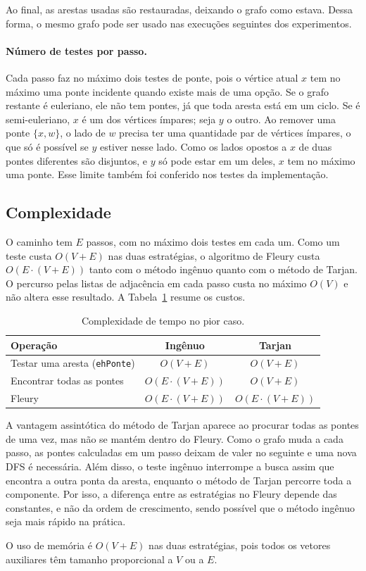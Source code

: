 Ao final, as arestas usadas são restauradas, deixando o grafo como estava. Dessa forma, o mesmo grafo pode ser usado nas execuções seguintes dos experimentos.

\paragraph{Número de testes por passo.} Cada passo faz no máximo dois testes de ponte, pois o vértice atual $x$ tem no máximo uma ponte incidente quando existe mais de uma opção. Se o grafo restante é euleriano, ele não tem pontes, já que toda aresta está em um ciclo. Se é semi-euleriano, $x$ é um dos vértices ímpares; seja $y$ o outro. Ao remover uma ponte $\{x, w\}$, o lado de $w$ precisa ter uma quantidade par de vértices ímpares, o que só é possível se $y$ estiver nesse lado. Como os lados opostos a $x$ de duas pontes diferentes são disjuntos, e $y$ só pode estar em um deles, $x$ tem no máximo uma ponte. Esse limite também foi conferido nos testes da implementação.

\subsection{Complexidade}

O caminho tem $E$ passos, com no máximo dois testes em cada um. Como um teste custa $O(V + E)$ nas duas estratégias, o algoritmo de Fleury custa $O(E \cdot (V + E))$ tanto com o método ingênuo quanto com o método de Tarjan. O percurso pelas listas de adjacência em cada passo custa no máximo $O(V)$ e não altera esse resultado. A Tabela~\ref{tab:complexidade} resume os custos.

\begin{table}[ht]
  \centering
  \caption{Complexidade de tempo no pior caso.}
  \label{tab:complexidade}
  \begin{tabular}{lcc}
    \hline
    Operação & Ingênuo & Tarjan \\
    \hline
    Testar uma aresta (\texttt{ehPonte}) & $O(V + E)$ & $O(V + E)$ \\
    Encontrar todas as pontes & $O(E \cdot (V + E))$ & $O(V + E)$ \\
    Fleury & $O(E \cdot (V + E))$ & $O(E \cdot (V + E))$ \\
    \hline
  \end{tabular}
\end{table}

A vantagem assintótica do método de Tarjan aparece ao procurar todas as pontes de uma vez, mas não se mantém dentro do Fleury. Como o grafo muda a cada passo, as pontes calculadas em um passo deixam de valer no seguinte e uma nova DFS é necessária. Além disso, o teste ingênuo interrompe a busca assim que encontra a outra ponta da aresta, enquanto o método de Tarjan percorre toda a componente. Por isso, a diferença entre as estratégias no Fleury depende das constantes, e não da ordem de crescimento, sendo possível que o método ingênuo seja mais rápido na prática.

O uso de memória é $O(V + E)$ nas duas estratégias, pois todos os vetores auxiliares têm tamanho proporcional a $V$ ou a $E$.
